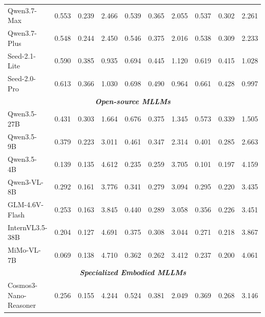 \begin{table}[t]
\begin{tabular}{@{}l ccc ccc cc c@{}}
Qwen3.7-Max~\cite{qwen2026qwen37plus}
& 0.553 & 0.239 & 2.466
& 0.539 & 0.365 & 2.055
& 0.537 & 0.302 & 2.261 \\

Qwen3.7-Plus~\cite{qwen2026qwen37plus}
& 0.548 & 0.244 & 2.450
& 0.546 & 0.375 & 2.016
& 0.538 & 0.309 & 2.233 \\

Seed-2.1-Lite~\cite{seed2026seed21}
& 0.590 & 0.385 & 0.935
& 0.694 & 0.445 & 1.120
& 0.619 & 0.415 & 1.028 \\

Seed-2.0-Pro~\cite{seed2026seed20}
& 0.613 & 0.366 & 1.030
& 0.698 & 0.490 & 0.964
& 0.661 & 0.428 & 0.997 \\

\midrule
\multicolumn{10}{c}{\textit{\textbf{Open-source MLLMs}}}\\
\midrule
Qwen3.5-27B~\cite{qwen2026qwen35}
& 0.431 & 0.303 & 1.664
& 0.676 & 0.375 & 1.345
& 0.573 & 0.339 & 1.505 \\

Qwen3.5-9B~\cite{qwen2026qwen35}
& 0.379 & 0.223 & 3.011
& 0.461 & 0.347 & 2.314
& 0.401 & 0.285 & 2.663 \\

Qwen3.5-4B~\cite{qwen2026qwen35}
& 0.139 & 0.135 & 4.612
& 0.235 & 0.259 & 3.705
& 0.101 & 0.197 & 4.159 \\

Qwen3-VL-8B~\cite{bai2025qwen3vl}
& 0.292 & 0.161 & 3.776
& 0.341 & 0.279 & 3.094
& 0.295 & 0.220 & 3.435 \\

GLM-4.6V-Flash~\cite{vteam2025glm45vglm41vthinkingversatilemultimodal}
& 0.253 & 0.163 & 3.845
& 0.440 & 0.289 & 3.058
& 0.356 & 0.226 & 3.451 \\

InternVL3.5-38B~\cite{wang2025internvl3_5}
& 0.204 & 0.127 & 4.691
& 0.375 & 0.308 & 3.044
& 0.271 & 0.218 & 3.867 \\

MiMo-VL-7B~\cite{coreteam2025mimovltechnicalreport}
& 0.069 & 0.138 & 4.710
& 0.362 & 0.262 & 3.412
& 0.237 & 0.200 & 4.061 \\

\midrule
\multicolumn{10}{c}{\textit{\textbf{Specialized Embodied MLLMs}}}\\
\midrule
Cosmos3-Nano-Reasoner~\citep{nvidia2026cosmos3}
& 0.256 & 0.155 & 4.244
& 0.524 & 0.381 & 2.049
& 0.369 & 0.268 & 3.146 \\


\end{tabular}
\end{table}
